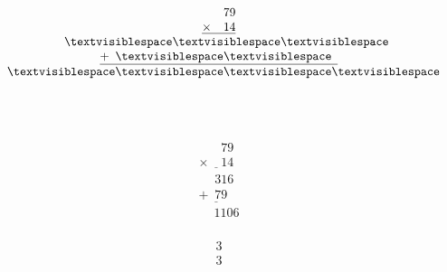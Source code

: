 \begin{minipage}[t]{0.3\linewidth}
\begin{align*}\begin{array}{c}
\phantom{
\times00
}
79\\
\underline{
\times
\phantom{
00
}
14
}\\
\phantom{
+0
}
\textvisiblespace
\textvisiblespace
\textvisiblespace
\\
\underline{
+
\phantom{
0
}
\textvisiblespace
\textvisiblespace
\phantom0
}
\\
\phantom{+}
\textvisiblespace
\textvisiblespace
\textvisiblespace
\textvisiblespace
\end{array}\end{align*}
\end{minipage}
\begin{minipage}[t]{0.05\linewidth}
\begin{align*}\begin{array}{c}
\textvisiblespace
\\
\textvisiblespace
\end{array}\end{align*}
\end{minipage}
\begin{minipage}[t]{0.3\linewidth}
\begin{align*}\begin{array}{c}
\phantom{
\times00
}
79\\
\underline{
\times
\phantom{
00
}
14
}\\
\phantom{
+0
}
316
\\
\underline{
+
\phantom{
0
}
79
\phantom0
}
\\
\phantom{+}
1106
\end{array}\end{align*}
\end{minipage}
\begin{minipage}[t]{0.05\linewidth}
\begin{align*}\begin{array}{c}
3
\\
3
\end{array}\end{align*}
\end{minipage}

